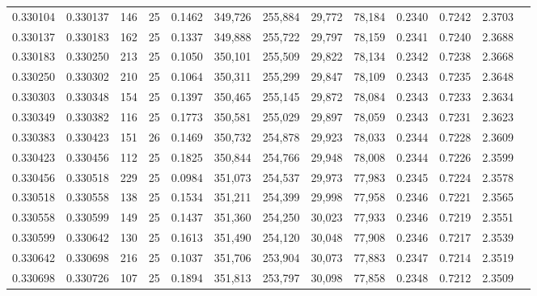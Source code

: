 \begin{tabular}{rrrrrrrrrrrrr}
0.330104 & 0.330137 &   146 &  25 &                                     0.1462 & 349,726 & 255,884 &  29,772 &  78,184 & 0.2340 & 0.7242 & 2.3703 \\
0.330137 & 0.330183 &   162 &  25 &                                     0.1337 & 349,888 & 255,722 &  29,797 &  78,159 & 0.2341 & 0.7240 & 2.3688 \\
0.330183 & 0.330250 &   213 &  25 &                                     0.1050 & 350,101 & 255,509 &  29,822 &  78,134 & 0.2342 & 0.7238 & 2.3668 \\
0.330250 & 0.330302 &   210 &  25 &                                     0.1064 & 350,311 & 255,299 &  29,847 &  78,109 & 0.2343 & 0.7235 & 2.3648 \\
0.330303 & 0.330348 &   154 &  25 &                                     0.1397 & 350,465 & 255,145 &  29,872 &  78,084 & 0.2343 & 0.7233 & 2.3634 \\
0.330349 & 0.330382 &   116 &  25 &                                     0.1773 & 350,581 & 255,029 &  29,897 &  78,059 & 0.2343 & 0.7231 & 2.3623 \\
0.330383 & 0.330423 &   151 &  26 &                                     0.1469 & 350,732 & 254,878 &  29,923 &  78,033 & 0.2344 & 0.7228 & 2.3609 \\
0.330423 & 0.330456 &   112 &  25 &                                     0.1825 & 350,844 & 254,766 &  29,948 &  78,008 & 0.2344 & 0.7226 & 2.3599 \\
0.330456 & 0.330518 &   229 &  25 &                                     0.0984 & 351,073 & 254,537 &  29,973 &  77,983 & 0.2345 & 0.7224 & 2.3578 \\
0.330518 & 0.330558 &   138 &  25 &                                     0.1534 & 351,211 & 254,399 &  29,998 &  77,958 & 0.2346 & 0.7221 & 2.3565 \\
0.330558 & 0.330599 &   149 &  25 &                                     0.1437 & 351,360 & 254,250 &  30,023 &  77,933 & 0.2346 & 0.7219 & 2.3551 \\
0.330599 & 0.330642 &   130 &  25 &                                     0.1613 & 351,490 & 254,120 &  30,048 &  77,908 & 0.2346 & 0.7217 & 2.3539 \\
0.330642 & 0.330698 &   216 &  25 &                                     0.1037 & 351,706 & 253,904 &  30,073 &  77,883 & 0.2347 & 0.7214 & 2.3519 \\
0.330698 & 0.330726 &   107 &  25 &                                     0.1894 & 351,813 & 253,797 &  30,098 &  77,858 & 0.2348 & 0.7212 & 2.3509 \\

\end{tabular}
